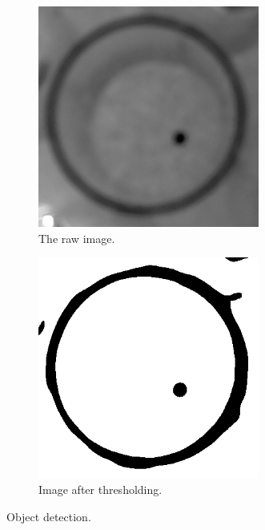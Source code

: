 \documentclass[10pt,a4paper, singlespace]{article}
\begin{document}
\begin{figure}[H]
	\centering
	\begin{subfigure}[b]{0.5\textwidth}
		\includegraphics[width=0.8\textwidth]{image_raw.png}
		\caption{The raw image.}
		\label{fig:raw}
	\end{subfigure}\hfill
	\begin{subfigure}[b]{0.5\textwidth}	
		\includegraphics[width=0.8\textwidth]{image_threshold.png}
		\caption{Image after thresholding.}
		\label{fig:threshold}
	\end{subfigure}\hfill
	\caption{Object detection.}
	\label{fig:thresholding}
\end{figure} 
\end{document}
